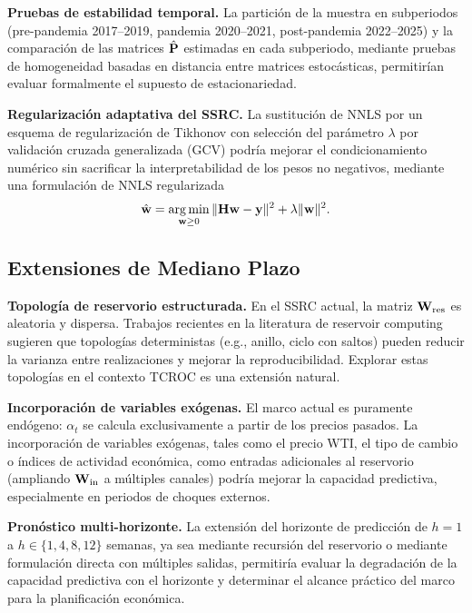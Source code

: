 \textbf{Pruebas de estabilidad temporal.}  La partición de la
muestra en subperiodos (pre-pandemia 2017--2019, pandemia 2020--2021,
post-pandemia 2022--2025) y la comparación de las matrices
$\hat{\mathbf{P}}$ estimadas en cada subperiodo, mediante pruebas de
homogeneidad basadas en distancia entre matrices estocásticas,
permitirían evaluar formalmente el supuesto de estacionariedad.

\textbf{Regularización adaptativa del SSRC.}  La sustitución de NNLS
por un esquema de regularización de Tikhonov con selección del
parámetro $\lambda$ por validación cruzada generalizada (GCV)
podría mejorar el condicionamiento numérico sin sacrificar la
interpretabilidad de los pesos no negativos, mediante una
formulación de NNLS regularizada
\[ \hat{\mathbf{w}} = \operatorname*{arg\,min}_{\mathbf{w} \ge 0} \|\mathbf{H}\mathbf{w} - \mathbf{y}\|^2 + \lambda\|\mathbf{w}\|^2. \]

\subsection{Extensiones de Mediano Plazo}

\textbf{Topología de reservorio estructurada.}  En el SSRC actual,
la matriz $\mathbf{W}_{\text{res}}$ es aleatoria y dispersa.  Trabajos
recientes en la literatura de reservoir computing sugieren que
topologías deterministas (e.g., anillo, ciclo con saltos) pueden
reducir la varianza entre realizaciones y mejorar la
reproducibilidad.  Explorar estas topologías en el contexto TCROC
es una extensión natural.

\textbf{Incorporación de variables exógenas.}  El marco actual es
puramente endógeno: $\alpha_t$ se calcula exclusivamente a partir
de los precios pasados.  La incorporación de variables exógenas,
tales como el precio WTI, el tipo de cambio o índices de actividad económica,
como entradas adicionales al reservorio (ampliando
$\mathbf{W}_{\text{in}}$ a múltiples canales) podría mejorar la
capacidad predictiva, especialmente en periodos de choques externos.

\textbf{Pronóstico multi-horizonte.}  La extensión del horizonte
de predicción de $h = 1$ a $h \in \{1, 4, 8, 12\}$ semanas, ya sea
mediante recursión del reservorio o mediante formulación directa
con múltiples salidas, permitiría evaluar la degradación de la
capacidad predictiva con el horizonte y determinar el alcance
práctico del marco para la planificación económica.

